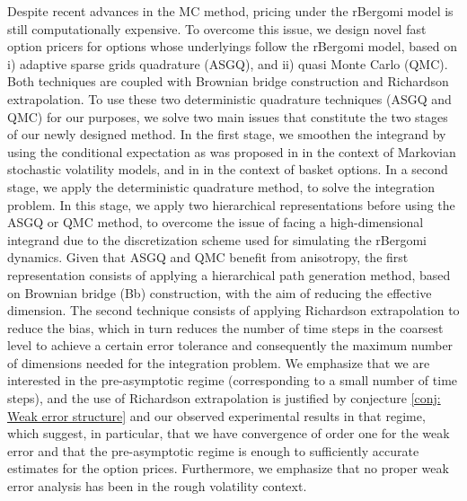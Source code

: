 Despite recent advances in the MC method, pricing under the rBergomi model is still computationally expensive. To overcome this issue,  we design  novel fast option pricers  for options whose underlyings follow the rBergomi model,  based on i) adaptive sparse grids quadrature (ASGQ), and ii) quasi Monte Carlo (QMC). Both techniques are coupled with Brownian bridge construction and Richardson extrapolation.  To use these two deterministic quadrature techniques (ASGQ and QMC) for our purposes, we  solve two main issues that constitute the two stages of our newly designed method. In the first stage, we smoothen the integrand by using the conditional expectation\red{,} as was proposed in \cite{romano1997contingent} in the context of Markovian stochastic volatility  models, and in \cite{bayersmoothing} in the context of basket options.   In a second stage, we apply the deterministic quadrature method, to solve the integration problem. In this stage, we apply two hierarchical representations before using the ASGQ or QMC method, to overcome the issue of facing a high-dimensional integrand due to the discretization scheme used for simulating the rBergomi dynamics. Given that ASGQ and QMC benefit from anisotropy, the first representation consists of applying a hierarchical  path generation method, based on Brownian
bridge (Bb) construction, with the aim of reducing the effective dimension. The second technique consists of applying Richardson extrapolation to reduce the bias, which in turn reduces the  number of time steps  in the coarsest level to achieve a certain error tolerance and consequently  the maximum number of dimensions needed for the integration problem. We emphasize that we are interested in  the pre-asymptotic regime (corresponding to a small number of time steps), and the use of Richardson extrapolation is justified by conjecture \ref{conj: Weak error structure} and our observed experimental results in that regime,  which suggest, in particular, that we have convergence of order one for the weak error and  that the pre-asymptotic regime is enough to  sufficiently accurate estimates for the option prices. Furthermore, we emphasize that no proper weak error analysis has been  in the rough volatility context.


